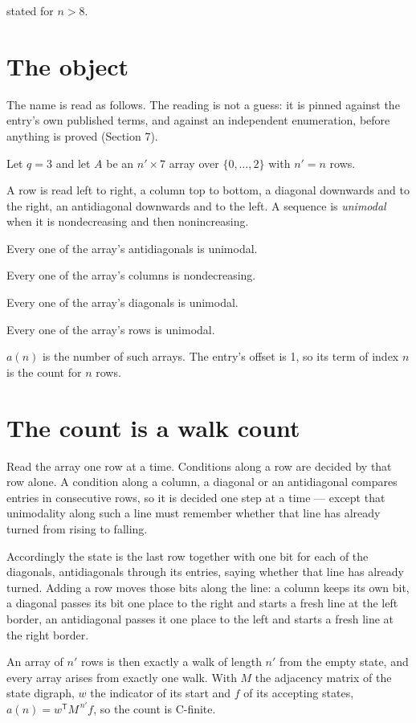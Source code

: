 \documentclass[11pt]{article}
\theoremstyle{definition}
\begin{document}
stated for $n > 8$.

\section{The object}

The name is read as follows. The reading is not a guess: it is pinned against the entry's own published terms, and against an independent enumeration, before anything is proved (Section 7).

Let $q = 3$ and let $A$ be an $n' \times 7$ array over $\{0,\dots,2\}$ with $n' = n$ rows.

A row is read left to right, a column top to bottom, a diagonal downwards and to the right, an antidiagonal downwards and to the left. A sequence is {\itshape unimodal} when it is nondecreasing and then nonincreasing.

Every one of the array's antidiagonals is unimodal.

Every one of the array's columns is nondecreasing.

Every one of the array's diagonals is unimodal.

Every one of the array's rows is unimodal.

$a(n)$ is the number of such arrays. The entry's offset is 1, so its term of index $n$ is the count for $n$ rows.

\section{The count is a walk count}

Read the array one row at a time. Conditions along a row are decided by that row alone. A condition along a column, a diagonal or an antidiagonal compares entries in consecutive rows, so it is decided one step at a time --- except that unimodality along such a line must remember whether that line has already turned from rising to falling.

Accordingly the state is the last row together with one bit for each of the diagonals, antidiagonals through its entries, saying whether that line has already turned. Adding a row moves those bits along the line: a column keeps its own bit, a diagonal passes its bit one place to the right and starts a fresh line at the left border, an antidiagonal passes it one place to the left and starts a fresh line at the right border.

An array of $n'$ rows is then exactly a walk of length $n'$ from the empty state, and every array arises from exactly one walk. With $M$ the adjacency matrix of the state digraph, $w$ the indicator of its start and $f$ of its accepting states, $a(n) = w^{\mathsf T}M^{\,n'}f$, so the count is C-finite.
\end{document}
